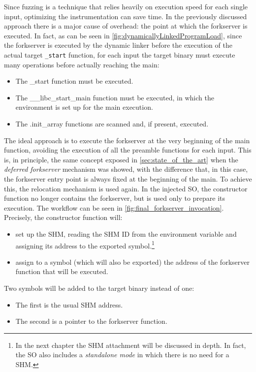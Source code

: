 Since fuzzing is a technique that relies heavily on execution speed for each single input, optimizing 
the instrumentation can save time.
In the previously discussed approach there is a major cause of overhead: the point at which the forkserver is executed.
In fact, as can be seen in \cref{fig:dynamicallyLinkedProgramLoad}, since the forkserver is executed by the dynamic linker 
before the execution of the actual target \texttt{\_start} function, for each input the target binary must execute many operations 
before actually reaching the main:
\begin{itemize}
    \item The \_start function must be executed.
    \item The \_\_libc\_start\_main function must be executed, in which the environment is set up for the main execution.
    \item The .init\_array functions are scanned and, if present, executed.
\end{itemize}
The ideal approach is to execute the forkserver at the very beginning of the main function, 
avoiding the execution of all the preamble functions for each input.
This is, in principle, the same concept exposed in \cref{sec:state_of_the_art} when the \textit{deferred forkserver} 
mechanism was showed, with the difference that, in this case, the forkserver entry point is always fixed at the beginning 
of the main.
To achieve this, the relocation mechanism is used again.
In the injected \gls{SO}, the constructor function no longer contains the forkserver, but is used only to 
prepare its execution. The workflow can be seen in \cref{fig:final_forkserver_invocation}.
Precisely, the constructor function will:
\begin{itemize}
    \item set up the \gls{SHM}, reading the \gls{SHM} ID from the environment variable and assigning its address to the exported symbol.\footnote{
        In the next chapter the \gls{SHM} attachment will be discussed in depth. In fact, the \gls{SO} also includes a \textit{standalone mode} 
        in which there is no need for a \gls{SHM}.
    }
    \item assign to a symbol (which will also be exported) the address of the forkserver function that will be executed.
\end{itemize}
Two symbols will be added to the target binary instead of one:
\begin{itemize}
    \item The first is the usual \gls{SHM} address.
    \item The second is a pointer to the forkserver function.
\end{itemize}

